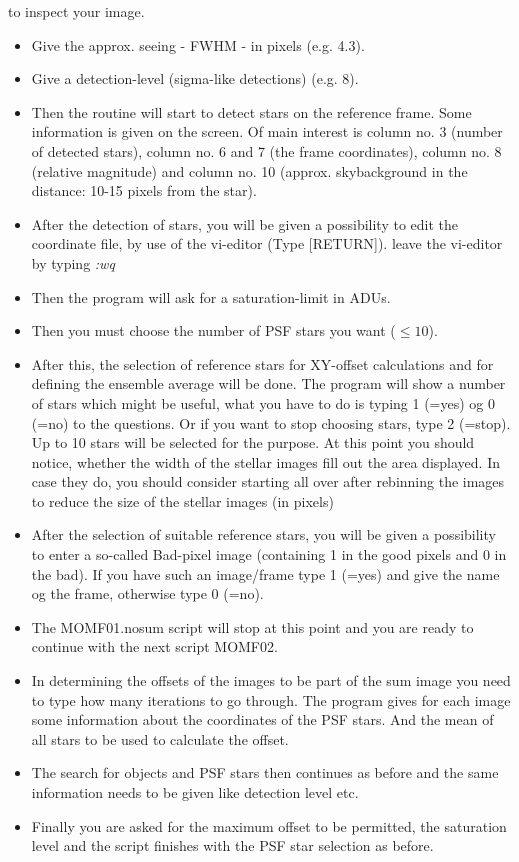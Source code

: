 \documentclass[]{article}
\begin{document}
to inspect your image.
\vspace{4mm}
\begin{itemize}
\item Give the approx. seeing - FWHM - in pixels (e.g. 4.3).
\item Give a detection-level (sigma-like detections) (e.g. 8).
\item Then the routine will start to detect stars on the reference
frame. Some information is given on the screen. Of main interest is
column no. 3 (number of detected stars), column no. 6 and 7 (the frame
coordinates), column no. 8 (relative magnitude) and column no. 10
(approx. skybackground in the distance: 10-15 pixels from the star).
\item After the detection of stars, you will be given a possibility to
edit the coordinate file, by use of the vi-editor (Type [RETURN]).
leave the vi-editor by typing {\em :wq}
\item Then the program will ask for a saturation-limit in ADUs.
\item Then you must choose the number of PSF stars you want ($\leq 10$).
\item After this, the selection of reference stars for
XY-offset calculations and for defining the ensemble average will
be done. The program will show a number of stars which might be useful,
what you have to do is typing 1 (=yes) og 0 (=no) to the questions.
Or if you want to stop choosing stars, type 2 (=stop).
Up to 10 stars will be selected for the purpose.
At this point you should notice, whether the width of the stellar
images fill out the area displayed. In case they do, you should
consider starting all over after rebinning the images to reduce
the size of the stellar images (in pixels)
\item After the selection of suitable reference stars, you will be given
a possibility to enter a so-called Bad-pixel image (containing 1 in the
good pixels and 0 in the bad). If you have such an image/frame type 1
(=yes) and give the name og the frame, otherwise type 0 (=no).
\item The MOMF01.nosum script will stop at this point and you are ready
to continue with the next script MOMF02.
\item In determining the offsets of the images to be part of the
sum image you need to type how many iterations to go through.
The program gives for each image some information about the coordinates
of the PSF stars. And the mean of all stars to be used to calculate the offset.
\item The search for objects and PSF stars then continues as before
and the same information needs to be given like detection level etc.
\item Finally you are asked for the maximum offset to be permitted,
the saturation level and the script finishes with the PSF star
selection as before.
\end{itemize}
\end{document}
